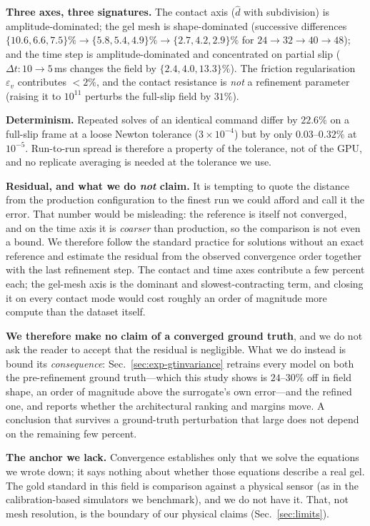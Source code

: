 \documentclass[conference]{IEEEtran}
\begin{document}
\textbf{Three axes, three signatures.} The contact axis ($\hat d$ with
subdivision) is amplitude-dominated; the gel mesh is shape-dominated
(successive differences $\{10.6, 6.6, 7.5\}\% \to \{5.8, 5.4, 4.9\}\% \to
\{2.7, 4.2, 2.9\}\%$ for $24\!\to\!32\!\to\!40\!\to\!48$); and the time step is
amplitude-dominated and concentrated on partial slip
($\Delta t: 10 \to 5$\,ms changes the field by $\{2.4, 4.0, 13.3\}\%$).
The friction regularisation $\varepsilon_v$ contributes $<2\%$, and the contact
resistance is \emph{not} a refinement parameter (raising it to $10^{11}$ perturbs
the full-slip field by $31\%$).

\textbf{Determinism.} Repeated solves of an identical command differ by $22.6\%$
on a full-slip frame at a loose Newton tolerance ($3\times10^{-4}$) but by only
$0.03$--$0.32\%$ at $10^{-5}$. Run-to-run spread is therefore a property of the
tolerance, not of the GPU, and no replicate averaging is needed at the tolerance
we use.

\textbf{Residual, and what we do \emph{not} claim.} It is tempting to quote the
distance from the production configuration to the finest run we could afford and
call it the error. That number would be misleading: the reference is itself not
converged, and on the time axis it is \emph{coarser} than production, so the
comparison is not even a bound. We therefore follow the standard practice for
solutions without an exact reference and estimate the residual from the observed
convergence order together with the last refinement step. The contact and time axes
contribute a few percent each; the gel-mesh axis is the dominant and
slowest-contracting term, and closing it on every contact mode would cost roughly
an order of magnitude more compute than the dataset itself.

\textbf{We therefore make no claim of a converged ground truth}, and we do not ask
the reader to accept that the residual is negligible. What we do instead is bound
its \emph{consequence}: Sec.~\ref{sec:exp-gtinvariance} retrains every model on
both the pre-refinement ground truth---which this study shows is $24$--$30\%$ off
in field shape, an order of magnitude above the surrogate's own error---and the
refined one, and reports whether the architectural ranking and margins move. A
conclusion that survives a ground-truth perturbation that large does not depend on
the remaining few percent.

\textbf{The anchor we lack.} Convergence establishes only that we solve the
equations we wrote down; it says nothing about whether those equations describe a
real gel. The gold standard in this field is comparison against a physical sensor
(as in the calibration-based simulators we benchmark), and we do not have it. That,
not mesh resolution, is the boundary of our physical claims (Sec.~\ref{sec:limits}).
\end{document}
